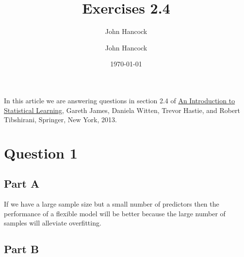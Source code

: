 \documentclass[11pt]{article}              %
\title{\bf Exercises 2.4}
\author{John Hancock}
\date{\today}
\begin{document}
\maketitle                              %
\tableofcontents                        %
\author{John Hancock}
\abstract
In this article we are answering questions in
section 2.4 of \underline{An Introduction to
Statistical Learning}, Gareth James,  Daniela 
Witten, Trevor Hastie, and Robert Tibshirani,
Springer, New York, 2013.

\section{Question 1}
\subsection{Part A}
If we have a large sample size but a small number
of predictors then the performance of a
flexible model will be better because the large
number of samples will alleviate overfitting.
\subsection{Part B}
\end{document}
